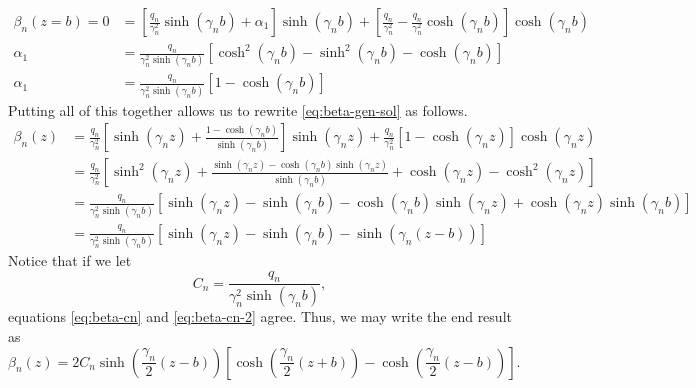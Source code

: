 \begin{align}
    \beta_n(z=b) = 0 &= \left[\frac{q_n}{\gamma_n^2}\sinh(\gamma_n b) + \alpha_1\right]\sinh(\gamma_n b) + \left[\frac{q_n}{\gamma_n^2} - \frac{q_n}{\gamma_n^2}\cosh(\gamma_n b)\right]\cosh(\gamma_n b)\\
    \alpha_1 &= \frac{q_n}{\gamma_n^2 \sinh(\gamma_n b)}\left[\cosh^2(\gamma_n b) - \sinh^2(\gamma_n b) - \cosh(\gamma_n b)\right]\\
    \alpha_1 &= \frac{q_n}{\gamma_n^2 \sinh(\gamma_n b)}\left[1 - \cosh(\gamma_n b)\right]
\end{align}
Putting all of this together allows us to rewrite \eqref{eq:beta-gen-sol} as follows.
\begin{align}
    \beta_n(z) &= \frac{q_n}{\gamma_n^2}\left[\sinh(\gamma_n z) + \frac{1 - \cosh(\gamma_n b)}{\sinh(\gamma_n b)}\right]\sinh(\gamma_n z) + \frac{q_n}{\gamma_n^2}\left[1 - \cosh(\gamma_n z)\right]\cosh(\gamma_n z)\nonumber\\
    &= \frac{q_n}{\gamma_n^2} \left[\sinh^2(\gamma_n z) + \frac{\sinh(\gamma_n z) - \cosh(\gamma_n b)\sinh(\gamma_n z)}{\sinh(\gamma_n b)} + \cosh(\gamma_n z) - \cosh^2(\gamma_n z)\right]\nonumber\\
    &= \frac{q_n}{\gamma_n^2 \sinh(\gamma_n b)}\left[\sinh(\gamma_n z) - \sinh(\gamma_n b) - \cosh(\gamma_n b)\sinh(\gamma_n z) + \cosh(\gamma_n z)\sinh(\gamma_n b)\right]\nonumber\\
    &= \frac{q_n}{\gamma_n^2 \sinh(\gamma_n b)}\left[\sinh(\gamma_n z) - \sinh(\gamma_n b) -\sinh(\gamma_n(z-b))\right] \label{eq:beta-cn-2}
\end{align}
Notice that if we let 
\begin{equation}
    C_n = \frac{q_n}{\gamma_n^2 \sinh(\gamma_n b)},
\end{equation}
equations \eqref{eq:beta-cn} and \eqref{eq:beta-cn-2} agree. Thus, we may write the end result as 
\begin{equation}
    \boxed{\beta_n(z) = 2C_n \sinh\left(\frac{\gamma_n}{2}(z-b)\right)\left[\cosh\left(\frac{\gamma_n}{2}(z+b)\right) - \cosh\left(\frac{\gamma_n}{2}(z-b)\right)\right].}
\end{equation}